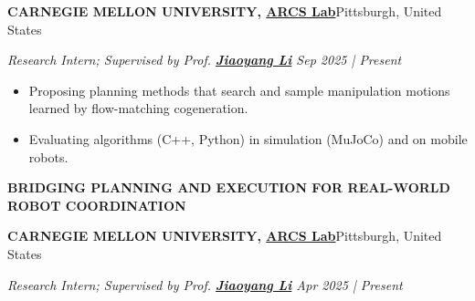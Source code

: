 \documentclass[a4paper,9pt]{extarticle}
\begin{document}
\par\textbf{CARNEGIE MELLON UNIVERSITY, {\href{https://www.ri.cmu.edu/robotics-groups/arcs-lab/}{ARCS Lab}}}\hfill Pittsburgh, United States   %
\par\textit{Research Intern; Supervised by Prof. {\href{https://jiaoyangli.me/}{\textbf{Jiaoyang Li}}} \hfill Sep 2025 | Present}  %
\begin{itemize}
    \item Proposing planning methods that search and sample manipulation motions learned by flow-matching cogeneration. 
    \item Evaluating algorithms (C++, Python) in simulation (MuJoCo) and on mobile robots.
\end{itemize}
{\textbf{\fontsize{12pt}{4pt}\selectfont B}\textbf{\scshape RIDGING PLANNING AND EXECUTION FOR REAL-WORLD ROBOT COORDINATION}}
\par\vspace{4pt}\noindent
\par\textbf{CARNEGIE MELLON UNIVERSITY, {\href{https://www.ri.cmu.edu/robotics-groups/arcs-lab/}{ARCS Lab}}}\hfill Pittsburgh, United States   %
\par\textit{Research Intern; Supervised by Prof. {\href{https://jiaoyangli.me/}{\textbf{Jiaoyang Li}}} \hfill Apr 2025 | Present}  %
\end{document}

